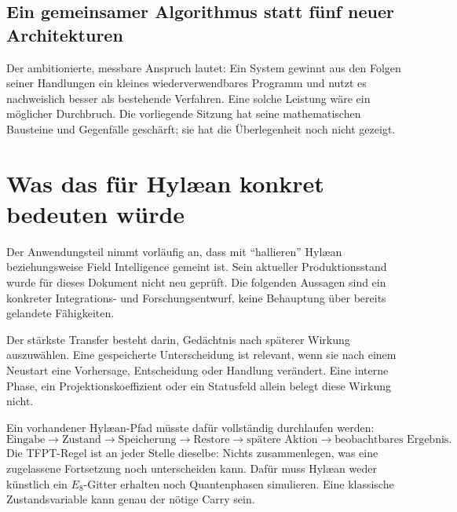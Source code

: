 \subsection{Ein gemeinsamer Algorithmus statt fünf neuer Architekturen}
\begin{center}
\end{center}
Der ambitionierte, messbare Anspruch lautet: Ein System gewinnt aus den Folgen seiner Handlungen ein kleines wiederverwendbares Programm und nutzt es nachweislich besser als bestehende Verfahren. Eine solche Leistung wäre ein möglicher Durchbruch. Die vorliegende Sitzung hat seine mathematischen Bausteine und Gegenfälle geschärft; sie hat die Überlegenheit noch nicht gezeigt.

\section{Was das für Hylæan konkret bedeuten würde}\label{sec:hylaean}

Der Anwendungsteil nimmt vorläufig an, dass mit ``hallieren'' Hylæan beziehungsweise Field Intelligence gemeint ist. Sein aktueller Produktionsstand wurde für dieses Dokument nicht neu geprüft. Die folgenden Aussagen sind ein konkreter Integrations- und Forschungsentwurf, keine Behauptung über bereits gelandete Fähigkeiten.

Der stärkste Transfer besteht darin, Gedächtnis nach späterer Wirkung auszuwählen. Eine gespeicherte Unterscheidung ist relevant, wenn sie nach einem Neustart eine Vorhersage, Entscheidung oder Handlung verändert. Eine interne Phase, ein Projektionskoeffizient oder ein Statusfeld allein belegt diese Wirkung nicht.

Ein vorhandener Hylæan-Pfad müsste dafür vollständig durchlaufen werden:
\begin{equation*}
\text{Eingabe}\to\text{Zustand}\to\text{Speicherung}\to\text{Restore}
\to\text{spätere Aktion}\to\text{beobachtbares Ergebnis}.
\end{equation*}
Die TFPT-Regel ist an jeder Stelle dieselbe: Nichts zusammenlegen, was eine zugelassene Fortsetzung noch unterscheiden kann. Dafür muss Hylæan weder künstlich ein $E_8$-Gitter erhalten noch Quantenphasen simulieren. Eine klassische Zustandsvariable kann genau der nötige Carry sein.

